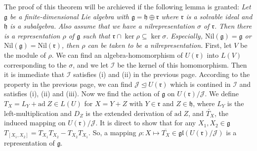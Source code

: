 \documentclass{article}
\newcommand{\lie}[1]{\mathfrak{#1}}
\newcommand{\ad}[1]{\mathrm{ad}\; #1}
\newcommand{\Nil}[1]{\mathrm{Nil}(#1)}
\begin{document}
The proof of this theorem will be archieved if the following lemma is granted: \textit{Let $\lie{g}$ be a finite-dimensional Lie algebra with $\lie{g} = \lie{h} \oplus \lie{r}$ where $\lie{r}$ is a solvable ideal and $\lie{h}$ is a subalgebra.}
\textit{Also assume that we have a nilrepresentation $\sigma$ of $\lie{r}$.}
\textit{Then there is a representation $\rho$ of $\lie{g}$ such that $\lie{r} \cap \ker{\rho} \subseteq \ker{\sigma}$.}
\textit{Especially, $\Nil{\lie{g}} = \lie{g}$ or $\Nil{\lie{g}} = \Nil{\lie{r}}$, then $\rho$ can be taken to be a nilrepresentation.}
First, let $V$ be the module of $\rho$.
We can find an algebra-homomorphism of $U(\lie{r})$ into $L(V)$ corresponding to the $\sigma$, and we let $\mathcal{I}$ be the kernel of this homomorphism.
Then it is immediate that $\mathcal{I}$ satisfies (i) and (ii) in the previous page.
According to the property in the previous page, we can find $\mathcal{J} \trianglelefteq U(\lie{r})$ which is contined in $\mathcal{I}$ and satisfies (i), (ii) and (iii).
Now we find the action of $\lie{g}$ on $U(\lie{r}) / \mathcal{J}$.
We define $T_X = L_Y + \ad{Z} \in L(U)$ for $X = Y + Z$ with $Y \in \lie{r}$ and $Z \in \lie{h}$, where $L_Y$ is the left-multiplication and $D_Z$ is the extended derivation of $\ad{Z}$, and $\tilde{T_X}$, the induced mapping on $U(\lie{r}) / \mathcal{J}$.
It is direct to show that for any $X_1, X_2 \in \lie{g}$ $T_{[X_1, X_2]} = T_{X_1} T_{X_2} - T_{X_2} T_{X_1}$.
So, a mapping $\rho : X \mapsto \overline{T_X} \in \lie{gl}(U(\lie{r}) / \mathcal{J})$ is a representation of $\lie{g}$.
\end{document}
